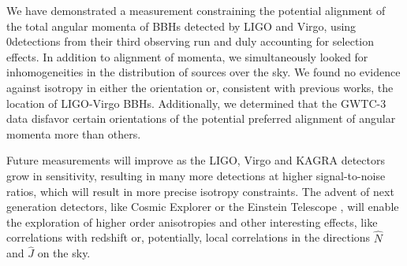 \documentclass[aps,prd,twocolumn,superscriptaddress,preprintnumbers,floatfix,nofootinbib]{revtex4-2}
\newcommand{\Nevents}{0}
\begin{document}
We have demonstrated a measurement constraining the potential alignment of the total angular momenta of \acp{BBH} detected by LIGO and Virgo, using \Nevents detections from their third observing run and duly accounting for selection effects.
In addition to alignment of momenta, we simultaneously looked for inhomogeneities in the distribution of sources over the sky.
We found no evidence against isotropy in either the orientation or, consistent with previous works, the location of LIGO-Virgo \acp{BBH}.
Additionally, we determined that the GWTC-3 data disfavor certain orientations of the potential preferred alignment of angular momenta more than others.

Future measurements will improve as the LIGO, Virgo and KAGRA detectors grow in sensitivity, resulting in many more detections at higher signal-to-noise ratios, which will result in more precise isotropy constraints.
The advent of next generation detectors, like Cosmic Explorer \cite{Dwyer:2014fpa,Evans:2016mbw,Reitze:2019iox} or the Einstein Telescope \cite{Punturo:2010zz}, will enable the exploration of higher order anisotropies and other interesting effects, like correlations with redshift or, potentially, local correlations in the directions $\hat{N}$ and $\hat{J}$ on the sky.
\end{document}
